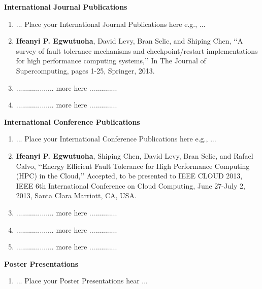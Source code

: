 
\begin{Publications}      %
 

\textbf{\large International Journal Publications}
\begin{enumerate}
  \item ... Place your International Journal Publications here e.g., ...    

     \item \textbf{Ifeanyi P. Egwutuoha}, David Levy, Bran Selic, and Shiping Chen, \lq\lq{}A survey
of fault tolerance mechanisms and checkpoint/restart implementations for
high performance computing systems,\rq\rq{} In The Journal of Supercomputing,
pages 1-25, Springer, 2013.


 \item ................... more here ..............
 \item ................... more here ..............
 
\end{enumerate}
  
\textbf{\large International Conference Publications}
 \begin{enumerate}

  \item ... Place your International Conference Publications here e.g., ... 

\item \textbf{Ifeanyi P. Egwutuoha}, Shiping Chen, David Levy, Bran Selic, and Rafael Calvo, \lq\lq{}Energy Efficient Fault Tolerance for High Performance Computing (HPC) in the Cloud,\rq\rq{} Accepted, to be presented to IEEE CLOUD 2013, IEEE 6th International Conference on Cloud Computing, June 27-July 2, 2013, Santa Clara Marriott, CA, USA.

 \item ................... more here ..............
 \item ................... more here ..............
 \item ................... more here ..............
 
 \end{enumerate}
 
\textbf{\large Poster Presentations}

\begin{enumerate}
\item ... Place your Poster Presentations hear ...
\end{enumerate}

\end{Publications}


